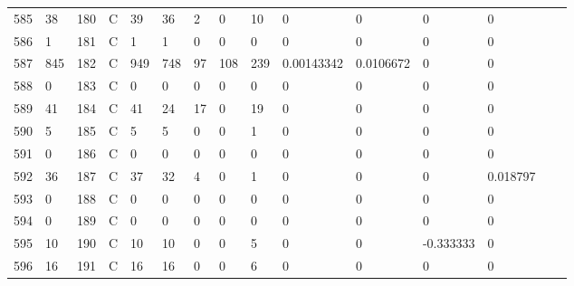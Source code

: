 \begin{longtable}{lllllllllllllll}
	585 & 38                & 180 & C   & 39                & 36                & 2                 & 0    & 10         & 0              & 0              & 0             & 0            \\
	586 & 1                 & 181 & C   & 1                 & 1                 & 0                 & 0    & 0          & 0              & 0              & 0             & 0            \\
	587 & 845               & 182 & C   & 949               & 748               & 97                & 108  & 239        & 0.00143342     & 0.0106672      & 0             & 0            \\
	588 & 0                 & 183 & C   & 0                 & 0                 & 0                 & 0    & 0          & 0              & 0              & 0             & 0            \\
	589 & 41                & 184 & C   & 41                & 24                & 17                & 0    & 19         & 0              & 0              & 0             & 0            \\
	590 & 5                 & 185 & C   & 5                 & 5                 & 0                 & 0    & 1          & 0              & 0              & 0             & 0            \\
	591 & 0                 & 186 & C   & 0                 & 0                 & 0                 & 0    & 0          & 0              & 0              & 0             & 0            \\
	592 & 36                & 187 & C   & 37                & 32                & 4                 & 0    & 1          & 0              & 0              & 0             & 0.018797     \\
	593 & 0                 & 188 & C   & 0                 & 0                 & 0                 & 0    & 0          & 0              & 0              & 0             & 0            \\
	594 & 0                 & 189 & C   & 0                 & 0                 & 0                 & 0    & 0          & 0              & 0              & 0             & 0            \\
	595 & 10                & 190 & C   & 10                & 10                & 0                 & 0    & 5          & 0              & 0              & -0.333333     & 0            \\
	596 & 16                & 191 & C   & 16                & 16                & 0                 & 0    & 6          & 0              & 0              & 0             & 0            \\

\end{longtable}
